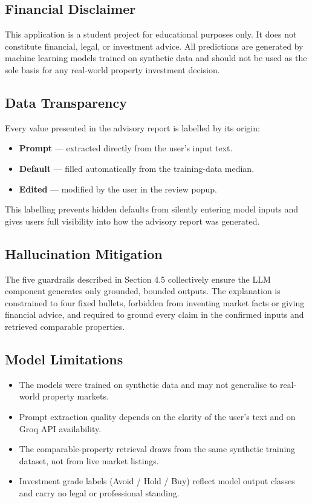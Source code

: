 \documentclass[12pt,a4paper]{article}
\begin{document}
\subsection{Financial Disclaimer}

This application is a student project for educational purposes only. It does not constitute financial, legal, or investment advice. All predictions are generated by machine learning models trained on synthetic data and should not be used as the sole basis for any real-world property investment decision.

\subsection{Data Transparency}

Every value presented in the advisory report is labelled by its origin:
\begin{itemize}[leftmargin=1.5em, noitemsep]
  \item \textbf{Prompt} --- extracted directly from the user's input text.
  \item \textbf{Default} --- filled automatically from the training-data median.
  \item \textbf{Edited} --- modified by the user in the review popup.
\end{itemize}

This labelling prevents hidden defaults from silently entering model inputs and gives users full visibility into how the advisory report was generated.

\subsection{Hallucination Mitigation}

The five guardrails described in Section 4.5 collectively ensure the LLM component generates only grounded, bounded outputs. The explanation is constrained to four fixed bullets, forbidden from inventing market facts or giving financial advice, and required to ground every claim in the confirmed inputs and retrieved comparable properties.

\subsection{Model Limitations}

\begin{itemize}[leftmargin=1.5em]
  \item The models were trained on synthetic data and may not generalise to real-world property markets.
  \item Prompt extraction quality depends on the clarity of the user's text and on Groq API availability.
  \item The comparable-property retrieval draws from the same synthetic training dataset, not from live market listings.
  \item Investment grade labels (Avoid / Hold / Buy) reflect model output classes and carry no legal or professional standing.
\end{itemize}
\end{document}
